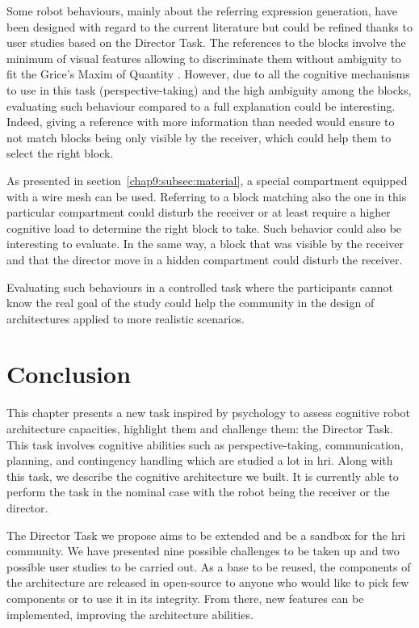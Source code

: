 \documentclass[a4paper,11pt,twoside]{StyleThese}
\begin{document}
Some robot behaviours, mainly about the referring expression generation, have been designed with regard to the current literature but could be refined thanks to user studies based on the Director Task. The references to the blocks involve the minimum of visual features allowing to discriminate them without ambiguity to fit the Grice's Maxim of Quantity \cite{grice_1975_logic}. However, due to all the cognitive mechanisms to use in this task (\eg perspective-taking) and the high ambiguity among the blocks, evaluating such behaviour compared to a full explanation could be interesting. Indeed, giving a reference with more information than needed would ensure to not match blocks being only visible by the receiver, which could help them to select the right block.

As presented in section~\ref{chap9:subsec:material}, a special compartment equipped with a wire mesh can be used. Referring to a block matching also the one in this particular compartment could disturb the receiver or at least require a higher cognitive load to determine the right block to take. Such behavior could also be interesting to evaluate. In the same way, a block that was visible by the receiver and that the director move in a hidden compartment could disturb the receiver.

Evaluating such behaviours in a controlled task where the participants cannot know the real goal of the study could help the community in the design of architectures applied to more realistic scenarios.

\section{Conclusion}
This chapter presents a new task inspired by psychology to assess cognitive robot architecture capacities, highlight them and challenge them: the Director Task. This task involves cognitive abilities such as perspective-taking, communication, planning, and contingency handling which are studied a lot in \acrshort{hri}. Along with this task, we describe the cognitive architecture we built. It is currently able to perform the task in the nominal case with the robot being the receiver or the director. 

The Director Task we propose aims to be extended and be a sandbox for the \acrshort{hri} community. We have presented nine possible challenges to be taken up and two possible user studies to be carried out. As a base to be reused, the components of the architecture are released in open-source to anyone who would like to pick few components or to use it in its integrity. From there, new features can be implemented, improving the architecture abilities.

\ifdefined{}
\else


\end{document}

